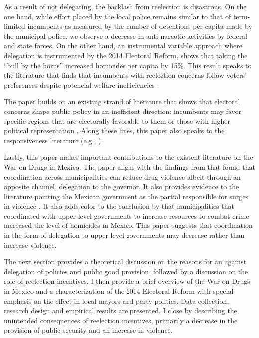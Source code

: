 \documentclass[12pt]{amsart}
\numberwithin{equation}{section}
\theoremstyle{definition}
\theoremstyle{definition}
\theoremstyle{definition}
\begin{document}
As a result of not delegating, the backlash from reelection is disastrous. On the one hand, while effort placed by the local police remains similar to that of term-limited incumbents as measured by the number of detentions per capita made by the municipal police, we observe a decrease in anti-narcotic activities by federal and state forces. On the other hand, an instrumental variable approach where delegation is instrumented by the 2014 Electoral Reform, shows that taking the ``bull by the horns'' increased homicides per capita by 15\%. This result speaks to the literature that finds that incumbents with reelection concerns follow voters’ preferences despite potencial welfare inefficiencies \citep{pulejo_querubin_2021}.

The paper builds on an existing strand of literature that shows that electoral concerns shape public policy in an inefficient direction: incumbents may favor specific regions that are electorally favorable to them \citep{schady_2000, Miguel_zaidi_2003, cole_2004, khemani_2007} or those with higher political representation  \citep{wright_1974, porto_2001, ansolabehere_etal_2002}. Along these lines, this paper also speaks to the responsiveness literature (e.g., \citet{besley_burges_2002}). 

Lastly, this paper makes important contributions to the existent literature on the War on Drugs in Mexico. The paper aligns with the findings from \citet{durante_gutierrez_2013} that found that coordination across municipalities can reduce drug violence albeit through an opposite channel, delegation to the governor. It also provides evidence to the literature pointing the Mexican government as the partial responsible for surges in violence \citep{escalante_2011, guerrero_2011}. It also adds color to the conclusion by \citet{dell_2015} that municipalities that coordinated with upper-level governments to increase resources to combat crime increased the level of homicides in Mexico. This paper suggests that coordination in the form of delegation to upper-level governments may decrease rather than increase violence.  

The next section provides a theoretical discussion on the reasons for an against delegation of policies and public good provision, followed by a discussion on the role of reelection incentives. I then provide a brief overview of the War on Drugs in Mexico and a characterization of the 2014 Electoral Reform with special emphasis on the effect in local mayors and party politics. Data collection, research design and empirical results are presented. I close by describing the unintended consequences of reelection incentives, primarily a decrease in the provision of public security and an increase in violence.
     
\end{document}
